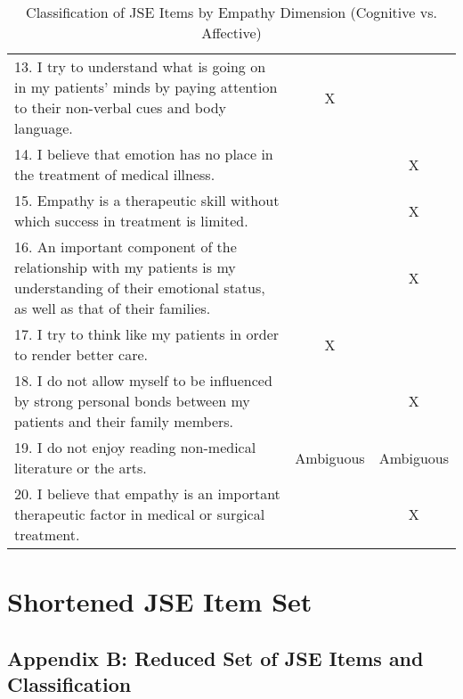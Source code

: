 \begin{table}[htbp]
\begin{tabular}{p{11cm}cc}
13. I try to understand what is going on in my patients’ minds by paying attention to their non-verbal cues and body language. & X & \\
14. I believe that emotion has no place in the treatment of medical illness. &  & X \\
15. Empathy is a therapeutic skill without which success in treatment is limited. &  & X \\
16. An important component of the relationship with my patients is my understanding of their emotional status, as well as that of their families. &  & X \\
17. I try to think like my patients in order to render better care. & X & \\
18. I do not allow myself to be influenced by strong personal bonds between my patients and their family members. &  & X \\
19. I do not enjoy reading non-medical literature or the arts. & Ambiguous & Ambiguous \\
20. I believe that empathy is an important therapeutic factor in medical or surgical treatment. &  & X \\
\bottomrule
\end{tabular}
\caption{Classification of JSE Items by Empathy Dimension (Cognitive vs. Affective)}
\label{tab:jse_classification}
\end{table}


\chapter{Shortened JSE Item Set}
\label{app:jse-short}

\section*{Appendix B: Reduced Set of JSE Items and Classification}

